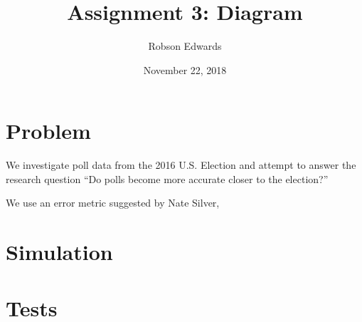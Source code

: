 \documentclass[11pt, oneside]{article}
\title{Assignment 3: Diagram}
\author{Robson Edwards}
\date{November 22, 2018}		%
\begin{document}
\maketitle

\section{Problem}

We investigate poll data from the 2016 U.S. Election and attempt to answer the research question ``Do polls become more accurate closer to the election?''

We use an error metric suggested by Nate Silver, 

\section{Simulation}



\section{Tests}
\end{document}
